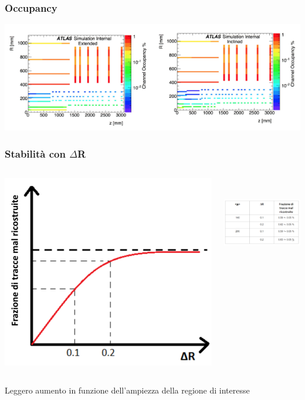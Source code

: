\documentclass{beamer}
\begin{document}
\begin{frame}
\frametitle{Occupancy}
\includegraphics[width=\textwidth]{occupancy}
\end{frame}

\begin{frame}[t]
\frametitle{Stabilit\`a con $\Delta$R}
\begin{columns}
\begin{column}{.5\textwidth}
\includegraphics[width=\textwidth]{fakeProbVsDR}
\end{column}
\begin{column}{.5\textwidth}
\includegraphics[width=\textwidth, height=4cm]{fakeProbVsDR_tab}
\end{column}
\end{columns}
\bigskip
\bigskip
\bigskip
Leggero aumento in funzione dell'ampiezza della regione di interesse
\end{frame}
\end{document}
